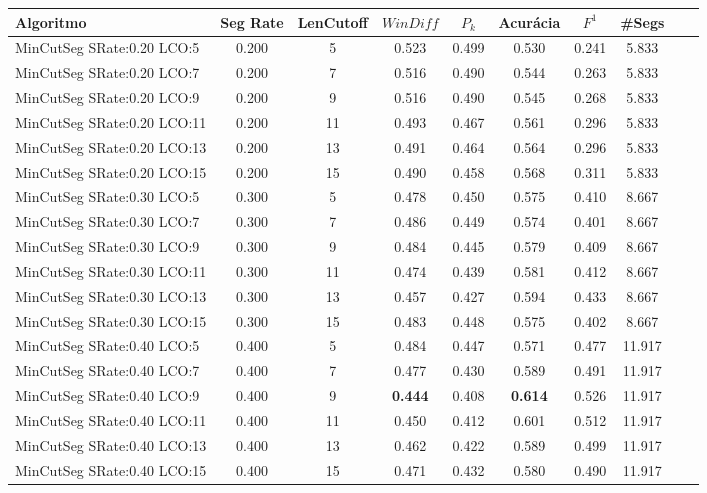 \documentclass{article}
\begin{document}
\begin{longtable}[c]{|l|c|c|c|c|c|c|c|c|c|} 
\hline 
Algoritmo & Seg Rate & LenCutoff & $WinDiff$ & $P_k$ & Acurácia & $F^1$ & \#Segs\\ \hline 
MinCutSeg SRate:0.20 LCO:5 & 0.200 & 5 & 0.523 & 0.499 & 0.530 & 0.241 & 5.833  \\ \hline 
 MinCutSeg SRate:0.20 LCO:7 & 0.200 & 7 & 0.516 & 0.490 & 0.544 & 0.263 & 5.833  \\ \hline 
 MinCutSeg SRate:0.20 LCO:9 & 0.200 & 9 & 0.516 & 0.490 & 0.545 & 0.268 & 5.833  \\ \hline 
 MinCutSeg SRate:0.20 LCO:11 & 0.200 & 11 & 0.493 & 0.467 & 0.561 & 0.296 & 5.833  \\ \hline 
 MinCutSeg SRate:0.20 LCO:13 & 0.200 & 13 & 0.491 & 0.464 & 0.564 & 0.296 & 5.833  \\ \hline 
 MinCutSeg SRate:0.20 LCO:15 & 0.200 & 15 & 0.490 & 0.458 & 0.568 & 0.311 & 5.833  \\ \hline 
 MinCutSeg SRate:0.30 LCO:5 & 0.300 & 5 & 0.478 & 0.450 & 0.575 & 0.410 & 8.667  \\ \hline 
 MinCutSeg SRate:0.30 LCO:7 & 0.300 & 7 & 0.486 & 0.449 & 0.574 & 0.401 & 8.667  \\ \hline 
 MinCutSeg SRate:0.30 LCO:9 & 0.300 & 9 & 0.484 & 0.445 & 0.579 & 0.409 & 8.667  \\ \hline 
 MinCutSeg SRate:0.30 LCO:11 & 0.300 & 11 & 0.474 & 0.439 & 0.581 & 0.412 & 8.667  \\ \hline 
 MinCutSeg SRate:0.30 LCO:13 & 0.300 & 13 & 0.457 & 0.427 & 0.594 & 0.433 & 8.667  \\ \hline 
 MinCutSeg SRate:0.30 LCO:15 & 0.300 & 15 & 0.483 & 0.448 & 0.575 & 0.402 & 8.667  \\ \hline 
 MinCutSeg SRate:0.40 LCO:5 & 0.400 & 5 & 0.484 & 0.447 & 0.571 & 0.477 & 11.917  \\ \hline 
 MinCutSeg SRate:0.40 LCO:7 & 0.400 & 7 & 0.477 & 0.430 & 0.589 & 0.491 & 11.917  \\ \hline 
 MinCutSeg SRate:0.40 LCO:9 & 0.400 & 9 & \cellcolor{gray!20} \textbf{0.444} & 0.408 & \cellcolor{gray!20} \textbf{0.614} & 0.526 & 11.917  \\ \hline 
 MinCutSeg SRate:0.40 LCO:11 & 0.400 & 11 & 0.450 & 0.412 & 0.601 & 0.512 & 11.917  \\ \hline 
 MinCutSeg SRate:0.40 LCO:13 & 0.400 & 13 & 0.462 & 0.422 & 0.589 & 0.499 & 11.917  \\ \hline 
 MinCutSeg SRate:0.40 LCO:15 & 0.400 & 15 & 0.471 & 0.432 & 0.580 & 0.490 & 11.917  \\ \hline 

\end{longtable}
\end{document}
